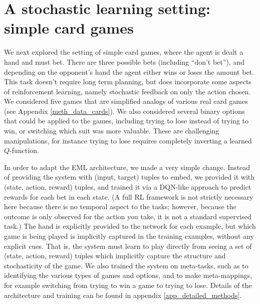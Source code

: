 \documentclass{article}
\begin{document}
\section{A stochastic learning setting: simple card games}\label{sec_cards}
\vspace{-0.5em} %
We next explored the setting of simple card games, where the agent is dealt a hand and must bet. There are three possible bets (including ``don't bet''), and depending on the opponent's hand the agent either wins or loses the amount bet. This task doesn't require long term planning, but does incorporate some aspects of reinforcement learning, namely stochastic feedback on only the action chosen. We considered five games that are simplified analogs of various real card games (see Appendix \ref{meth_data_cards}). We also considered several binary options that could be applied to the games, including trying to lose instead of trying to win, or switching which suit was more valuable. These are challenging manipulations, for instance trying to lose requires completely inverting a learned $Q$-function. \par
In order to adapt the EML architecture, we made a very simple change. Instead of providing the system with (input, target) tuples to embed, we provided it with (state, action, reward) tuples, and trained it via a DQN-like approach \citep{Mnih2015} to predict rewards for each bet in each state. (A full RL framework is not strictly necessary here because there is no temporal aspect to the tasks; however, because the outcome is only observed for the action you take, it is not a standard supervised task.) The hand is explicitly provided to the network for each example, but which game is being played is implicitly captured in the training examples, without any explicit cues. That is, the system must learn to play directly from seeing a set of (state, action, reward) tuples which implicitly capture the structure and stochasticity of the game. We also trained the system on meta-tasks, such as to identifying the various types of games and options, and to make meta-mappings, for example switching from trying to win a game to trying to lose. Details of the architecture and training can be found in appendix \ref{app_detailed_methods}. \par
\vspace{-0.7em}
\end{document}
